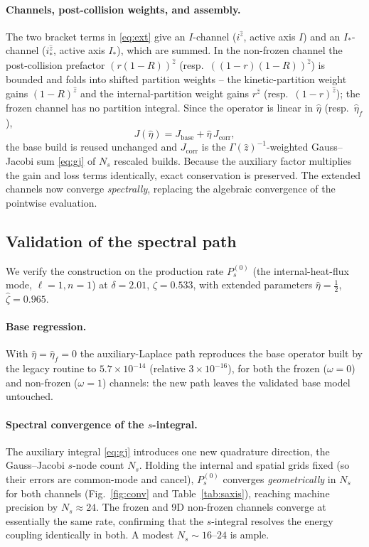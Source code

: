 \documentclass[11pt]{article}
\newcommand{\etah}{\hat{\eta}}
\begin{document}
\paragraph{Channels, post-collision weights, and assembly.}
The two bracket terms in \eqref{eq:ext} give an $I$-channel ($i^{\hat z}$, active axis $I$) and an
$I_*$-channel ($i_*^{\hat z}$, active axis $I_*$), which are summed. In the non-frozen channel the
post-collision prefactor $(r(1-R))^{\hat z}$ (resp.\ $((1-r)(1-R))^{\hat z}$) is bounded and folds
into shifted partition weights -- the kinetic-partition weight gains $(1-R)^{\hat z}$ and the
internal-partition weight gains $r^{\hat z}$ (resp.\ $(1-r)^{\hat z}$); the frozen channel has no
partition integral. Since the operator is linear in $\etah$ (resp.\ $\etah_f$),
\begin{equation}
J(\etah)=J_{\mathrm{base}}+\etah\,J_{\mathrm{corr}},
\end{equation}
the base build is reused unchanged and $J_{\mathrm{corr}}$ is the $\Gamma(\hat z)^{-1}$-weighted
Gauss--Jacobi sum \eqref{eq:gj} of $N_s$ rescaled builds. Because the auxiliary factor multiplies
the gain and loss terms identically, exact conservation is preserved. The extended channels now
converge \emph{spectrally}, replacing the algebraic convergence of the pointwise evaluation.

\subsection{Validation of the spectral path}
\label{sec:laplaceval}
We verify the construction on the production rate $P_s^{(0)}$ (the internal-heat-flux mode,
$\ell{=}1,n{=}1$) at $\delta=2.01$, $\zeta=0.533$, with extended parameters $\hat\eta=\tfrac12$,
$\hat\zeta=0.965$.

\paragraph{Base regression.}
With $\hat\eta=\hat\eta_f=0$ the auxiliary-Laplace path reproduces the base operator built by the
legacy routine to $5.7\times10^{-14}$ (relative $3\times10^{-16}$), for both the frozen
($\omega{=}0$) and non-frozen ($\omega{=}1$) channels: the new path leaves the validated base model
untouched.

\paragraph{Spectral convergence of the $s$-integral.}
The auxiliary integral \eqref{eq:gj} introduces one new quadrature direction, the Gauss--Jacobi
$s$-node count $N_s$. Holding the internal and spatial grids fixed (so their errors are
common-mode and cancel), $P_s^{(0)}$ converges \emph{geometrically} in $N_s$ for both channels
(Fig.~\ref{fig:conv} and Table~\ref{tab:saxis}), reaching machine precision by $N_s\!\approx\!24$.
The frozen and 9D non-frozen channels converge at essentially the same rate, confirming that the
$s$-integral resolves the energy coupling identically in both. A modest $N_s\!\sim\!16$--$24$ is
ample.
\end{document}
